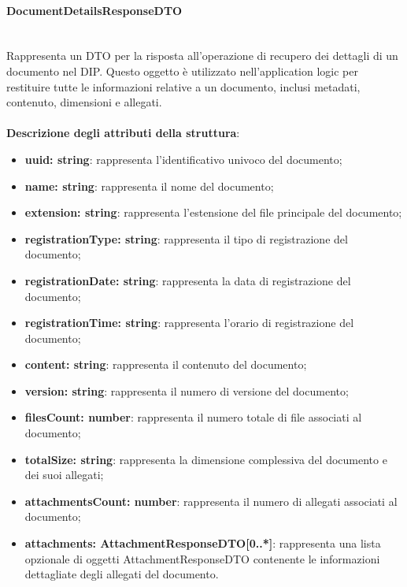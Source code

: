 \documentclass[a4paper,12pt]{article}
\begin{document}
{{{                \paragraph{DocumentDetailsResponseDTO}\label{par:DocumentDetailsResponseDTO}\mbox{}\\
                Rappresenta un DTO per la risposta all'operazione di recupero dei dettagli di un documento nel DIP. Questo oggetto è utilizzato nell'application logic per restituire tutte le informazioni relative a un documento, inclusi metadati, contenuto, dimensioni e allegati.\\
                \\
                \textbf{Descrizione degli attributi della struttura}:
                \begin{itemize}
                    \item \textbf{uuid: string}: rappresenta l'identificativo univoco del documento;
                    \item \textbf{name: string}: rappresenta il nome del documento;
                    \item \textbf{extension: string}: rappresenta l'estensione del file principale del documento;
                    \item \textbf{registrationType: string}: rappresenta il tipo di registrazione del documento;
                    \item \textbf{registrationDate: string}: rappresenta la data di registrazione del documento;
                    \item \textbf{registrationTime: string}: rappresenta l'orario di registrazione del documento;
                    \item \textbf{content: string}: rappresenta il contenuto del documento;
                    \item \textbf{version: string}: rappresenta il numero di versione del documento;
                    \item \textbf{filesCount: number}: rappresenta il numero totale di file associati al documento;
                    \item \textbf{totalSize: string}: rappresenta la dimensione complessiva del documento e dei suoi allegati;
                    \item \textbf{attachmentsCount: number}: rappresenta il numero di allegati associati al documento;
                    \item \textbf{attachments: AttachmentResponseDTO[0..*]}: rappresenta una lista opzionale di oggetti AttachmentResponseDTO contenente le informazioni dettagliate degli allegati del documento.
                \end{itemize}

}}}
\end{document}
